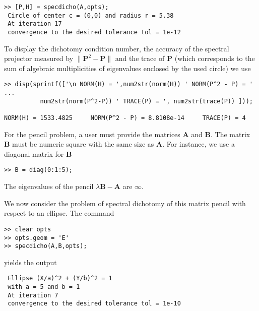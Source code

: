\documentclass[acmtocl]{acmtrans2m}
\newcommand{\Am}{\mathbf{A}}
\newcommand{\Bm}{\mathbf{B}}
\newcommand{\Pm}{\mathbf{P}}
\begin{document}
\begin{verbatim}
>> [P,H] = specdicho(A,opts);
 Circle of center c = (0,0) and radius r = 5.38
 At iteration 17
 convergence to the desired tolerance tol = 1e-12
\end{verbatim}
To display the dichotomy condition number,  the accuracy  of the spectral projector measured by $\|\Pm^2 - \Pm \|$ and the trace of $\Pm$ (which corresponds to the sum of algebraic multiplicities of  eigenvalues enclosed by the used circle)  we use
\begin{verbatim}
>> disp(sprintf(['\n NORM(H) = ',num2str(norm(H)) ' NORM(P^2 - P) = ' ...
	      num2str(norm(P^2-P)) ' TRACE(P) = ', num2str(trace(P)) ]));

NORM(H) = 1533.4825     NORM(P^2 - P) = 8.8108e-14     TRACE(P) = 4
\end{verbatim}

For the pencil problem, a user must provide the matrices $\Am$ and $\Bm$. The matrix $\Bm$  must be numeric square with the same size as $\Am$.
For instance, we use a diagonal matrix for $\Bm$
\begin{verbatim}
>> B = diag(0:1:5);
\end{verbatim}
The eigenvalues of the pencil $\lambda \Bm - \Am$ are {\tt $\infty$}.

We now consider the problem of spectral dichotomy of this  matrix pencil with respect to an ellipse. The command
\begin{verbatim}
>> clear opts
>> opts.geom = 'E'
>> specdicho(A,B,opts);
\end{verbatim}
yields the output
\begin{verbatim}
 Ellipse (X/a)^2 + (Y/b)^2 = 1
 with a = 5 and b = 1
 At iteration 7
 convergence to the desired tolerance tol = 1e-10
\end{verbatim}
\end{document}
